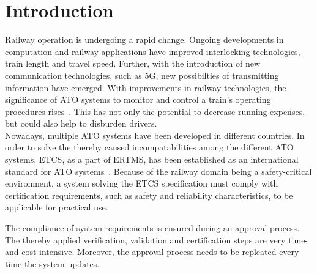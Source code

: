 \chapter{Introduction}
	
Railway operation is undergoing a rapid change.
Ongoing developments in computation and railway applications have improved interlocking technologies, train length and travel speed.
Further, with the introduction of new communication technologies, such as 5G, new possibilties of transmitting information have emerged.
With improvements in railway technologies, the significance of \gls*{ATO} systems to monitor and control a train's operating procedures rises~\cite{YIN2017RNDofATO}.
This has not only the potential to decrease running expenses, but could also help to disburden drivers.
\\

Nowadays, multiple \gls*{ATO} systems have been developed in different countries.
In order to solve the thereby caused incompatabilities among the different \gls*{ATO} systems, \gls*{ETCS}, as a part of \gls*{ERTMS}, has been established as an international standard for \gls*{ATO} systems~\cite{ETCS26}.
Because of the railway domain being a safety-critical environment, a system solving the \gls*{ETCS} specification must comply with certification requirements, such as safety and reliability characteristics, to be applicable for practical use.

The compliance of system requirements is ensured during an approval process.
The thereby applied verification, validation and certification steps are very time- and cost-intensive.
Moreover, the approval process needs to be repleated every time the system updates.
\\

